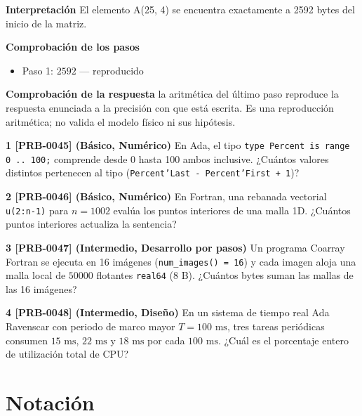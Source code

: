 \documentclass{book}
\begin{document}
\begin{tcolorbox}[title={Problema resuelto}, studiumworked, breakable]
\noindent\textbf{Interpretación}
El elemento A(25, 4) se encuentra exactamente a 2592 bytes del inicio de la matriz.

\noindent\textbf{Comprobación de los pasos}
\begin{itemize}
\item Paso 1: $2592$ — reproducido
\end{itemize}

\noindent\textbf{Comprobación de la respuesta} la aritmética del último paso reproduce la respuesta enunciada a la precisión con que está escrita. Es una reproducción aritmética; no valida el modelo físico ni sus hipótesis.
\end{tcolorbox}

\begin{tcolorbox}[title={Ejercicios}, studiumworked, breakable]

\noindent\textbf{1 [PRB-0045] (Básico, Numérico)}
En Ada, el tipo \texttt{type Percent is range 0 .. 100;} comprende desde 0 hasta 100 ambos inclusive. ¿Cuántos valores distintos pertenecen al tipo (\texttt{Percent'Last - Percent'First + 1})?

\noindent\textbf{2 [PRB-0046] (Básico, Numérico)}
En Fortran, una rebanada vectorial \texttt{u(2:n-1)} para \(n = 1002\) evalúa los puntos interiores de una malla 1D. ¿Cuántos puntos interiores actualiza la sentencia?

\noindent\textbf{3 [PRB-0047] (Intermedio, Desarrollo por pasos)}
Un programa Coarray Fortran se ejecuta en 16 imágenes (\texttt{num\_images() = 16}) y cada imagen aloja una malla local de \(50000\) flotantes \texttt{real64} (8 B). ¿Cuántos bytes suman las mallas de las 16 imágenes?

\noindent\textbf{4 [PRB-0048] (Intermedio, Diseño)}
En un sistema de tiempo real Ada Ravenscar con periodo de marco mayor \(T = 100\text{ ms}\), tres tareas periódicas consumen \(15\text{ ms}\), \(22\text{ ms}\) y \(18\text{ ms}\) por cada \(100\text{ ms}\). ¿Cuál es el porcentaje entero de utilización total de CPU?
\end{tcolorbox}
\appendix
\chapter{Notación}
\end{document}
